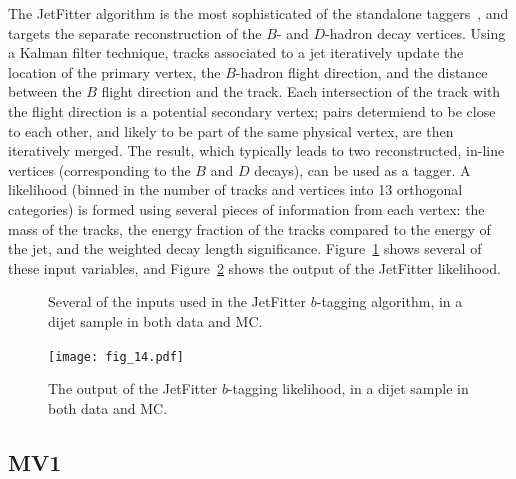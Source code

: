 The JetFitter algorithm is the most sophisticated of the standalone taggers~\cite{ATLAS-B,JetFitter}, and targets the separate reconstruction of the $B$- and $D$-hadron decay vertices. Using a Kalman filter technique, tracks associated to a jet iteratively update the location of the primary vertex, the $B$-hadron flight direction, and the distance between the $B$ flight direction and the track. Each intersection of the track with the flight direction is a potential secondary vertex; pairs determiend to be close to each other, and likely to be part of the same physical vertex, are then iteratively merged. The result, which typically leads to two reconstructed, in-line vertices (corresponding to the $B$ and $D$ decays), can be used as a tagger. A likelihood (binned in the number of tracks and vertices into 13 orthogonal categories) is formed using several pieces of information from each vertex: the mass of the tracks, the energy fraction of the tracks compared to the energy of the jet, and the weighted decay length significance. Figure~\ref{fig:jet-reconstruction:b-tagging:jetfitter} shows several of these input variables, and Figure~\ref{fig:jet-reconstruction:b-tagging:jetfitter_total} shows the output of the JetFitter likelihood.


\begin{figure}
\centering
{}
\label{fig:jet-reconstruction:b-tagging:jetfitter}
\caption{Several of the inputs used in the JetFitter $b$-tagging algorithm, in a dijet sample in both data and MC.}
\end{figure}




\begin{figure}
\centering
\texttt{[image: fig\_14.pdf]}
\label{fig:jet-reconstruction:b-tagging:jetfitter_total}
\caption{The output of the JetFitter $b$-tagging likelihood, in a dijet sample in both data and MC.}
\end{figure}


\subsection{MV1}

